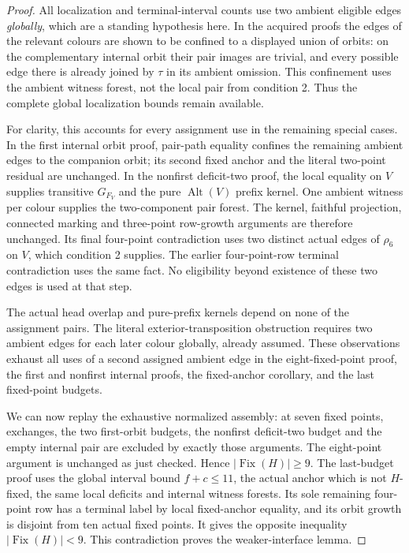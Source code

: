 \documentclass[11pt,a4paper]{article}
\newcommand{\Alt}{\operatorname{Alt}}
\begin{document}
\begin{proof}
All localization and terminal-interval counts use
two ambient eligible edges \emph{globally}, which
are a standing hypothesis here. In the acquired
proofs the edges of the relevant colours are shown
to be confined to a displayed union of orbits:
on the complementary internal orbit their pair
images are trivial, and every possible edge there
is already joined by $\tau$ in its ambient omission.
This confinement uses the ambient witness forest,
not the local pair from condition 2. Thus the
complete global localization bounds remain available.

For clarity, this accounts for every assignment use
in the remaining special cases. In the first internal
orbit proof, pair-path equality confines the remaining
ambient edges to the companion orbit; its second
fixed anchor and the literal two-point residual are
unchanged. In the nonfirst deficit-two proof, the
local equality on $V$ supplies transitive $G_{F_V}$
and the pure $\Alt(V)$ prefix kernel. One ambient
witness per colour supplies the two-component
pair forest. The kernel, faithful projection,
connected marking and three-point row-growth
arguments are therefore unchanged. Its final
four-point contradiction uses two distinct actual
edges of $\rho_6$ on $V$, which condition 2 supplies.
The earlier four-point-row terminal contradiction
uses the same fact. No eligibility beyond existence
of these two edges is used at that step.

The actual head overlap and pure-prefix kernels
depend on none of the assignment pairs. The literal
exterior-transposition obstruction requires two
ambient edges for each later colour globally,
already assumed. These observations exhaust all
uses of a second assigned ambient edge in the
eight-fixed-point proof, the first and nonfirst
internal proofs, the fixed-anchor corollary, and
the last fixed-point budgets.

We can now replay the exhaustive normalized assembly:
at seven fixed points, exchanges, the two first-orbit
budgets, the nonfirst deficit-two budget and the empty
internal pair are excluded by exactly those arguments.
The eight-point argument is unchanged as just checked.
Hence $|\operatorname{Fix}(H)|\ge9$. The last-budget
proof uses the global interval bound $f+c\le11$,
the actual anchor which is not $H$-fixed, the same
local deficits and internal witness forests. Its
sole remaining four-point row has a terminal label
by local fixed-anchor equality, and its orbit growth
is disjoint from ten actual fixed points. It gives
the opposite inequality $|\operatorname{Fix}(H)|<9$.
This contradiction proves the weaker-interface lemma.
\end{proof}
\end{document}
